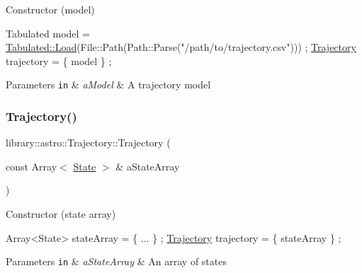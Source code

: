 Constructor (model) 


\begin{DoxyCode}
Tabulated model = \hyperlink{classlibrary_1_1astro_1_1trajectory_1_1models_1_1_tabulated_a63c053c7a308930aa03b354292c85c0f}{Tabulated::Load}(File::Path(Path::Parse(\textcolor{stringliteral}{"/path/to/trajectory.csv"}))) ;
\hyperlink{classlibrary_1_1astro_1_1_trajectory_a8e5c7740915ca947e067c0f419ac1c65}{Trajectory} trajectory = \{ model \} ;
\end{DoxyCode}



\begin{DoxyParams}[1]{Parameters}
\mbox{\tt in}  & {\em a\+Model} & A trajectory model \\
\hline
\end{DoxyParams}
\mbox{\label{classlibrary_1_1astro_1_1_trajectory_abe42247164ca6f966ae5f0c2dfa29182}} 
\subsubsection{\texorpdfstring{Trajectory()}{Trajectory()}\hspace{0.1cm}{\footnotesize\ttfamily [2/3]}}
{\footnotesize\ttfamily library\+::astro\+::\+Trajectory\+::\+Trajectory (\begin{DoxyParamCaption}\item[{const Array$<$ \hyperlink{classlibrary_1_1astro_1_1trajectory_1_1_state}{State} $>$ \&}]{a\+State\+Array }\end{DoxyParamCaption})}



Constructor (state array) 


\begin{DoxyCode}
Array<State> stateArray = \{ ... \} ;
\hyperlink{classlibrary_1_1astro_1_1_trajectory_a8e5c7740915ca947e067c0f419ac1c65}{Trajectory} trajectory = \{ stateArray \} ;
\end{DoxyCode}



\begin{DoxyParams}[1]{Parameters}
\mbox{\tt in}  & {\em a\+State\+Array} & An array of states \\
\hline
\end{DoxyParams}
\mbox{\label{classlibrary_1_1astro_1_1_trajectory_a63aa2162979ed09fedded192871f0f0a}} 
